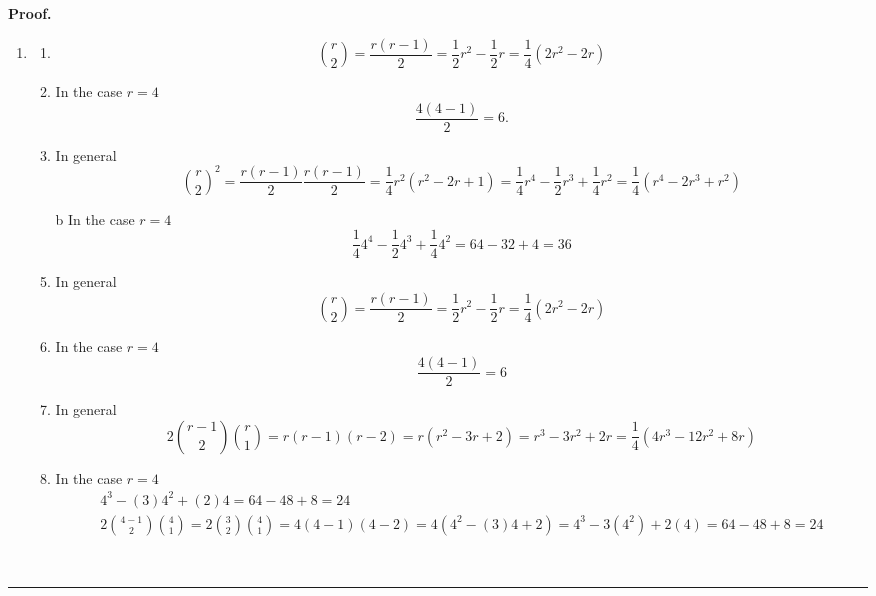 \documentclass[aps,preprint]{revtex4}%
\newenvironment{proof}[1][Proof]{\noindent\textbf{#1.} }{\ \rule{0.5em}{0.5em}}
\begin{document}
\begin{proof}
\begin{enumerate}
\item
\begin{enumerate}
\item
\begin{equation}
\binom{r}{2}=\frac{r\left(  r-1\right)  }{2}=\frac{1}{2}r^{2}-\frac{1}%
{2}r=\frac{1}{4}\left(  2r^{2}-2r\right)
\end{equation}


\item In the case $r=4$%
\begin{equation}
\frac{4\left(  4-1\right)  }{2}=6.
\end{equation}


\item In general
\begin{equation}
\binom{r}{2}^{2}=\frac{r\left(  r-1\right)  }{2}\frac{r\left(  r-1\right)
}{2}=\frac{1}{4}r^{2}\left(  r^{2}-2r+1\right)  =\frac{1}{4}r^{4}-\frac{1}%
{2}r^{3}+\frac{1}{4}r^{2}=\frac{1}{4}\left(  r^{4}-2r^{3}+r^{2}\right)
\end{equation}


\item[b] In the case $r=4$%
\begin{equation}
\frac{1}{4}4^{4}-\frac{1}{2}4^{3}+\frac{1}{4}4^{2}=64-32+4=36
\end{equation}


\item In general%
\begin{equation}
\binom{r}{2}=\frac{r\left(  r-1\right)  }{2}=\frac{1}{2}r^{2}-\frac{1}%
{2}r=\frac{1}{4}\left(  2r^{2}-2r\right)
\end{equation}


\item In the case $r=4$%
\begin{equation}
\frac{4\left(  4-1\right)  }{2}=6
\end{equation}


\item In general%
\begin{equation}
2\binom{r-1}{2}\binom{r}{1}=r\left(  r-1\right)  \left(  r-2\right)  =r\left(
r^{2}-3r+2\right)  =r^{3}-3r^{2}+2r=\frac{1}{4}\left(  4r^{3}-12r^{2}%
+8r\right)
\end{equation}


\item In the case $r=4$%
\begin{gather}
4^{3}-\left(  3\right)  4^{2}+\left(  2\right)  4=64-48+8=24\\
2\binom{4-1}{2}\binom{4}{1}=2\binom{3}{2}\binom{4}{1}=4\left(  4-1\right)
\left(  4-2\right)  =4\left(  4^{2}-\left(  3\right)  4+2\right)
=4^{3}-3\left(  4^{2}\right)  +2\left(  4\right)  =64-48+8=24
\end{gather}



\end{enumerate}
\end{enumerate}
\end{proof}
\end{document}
